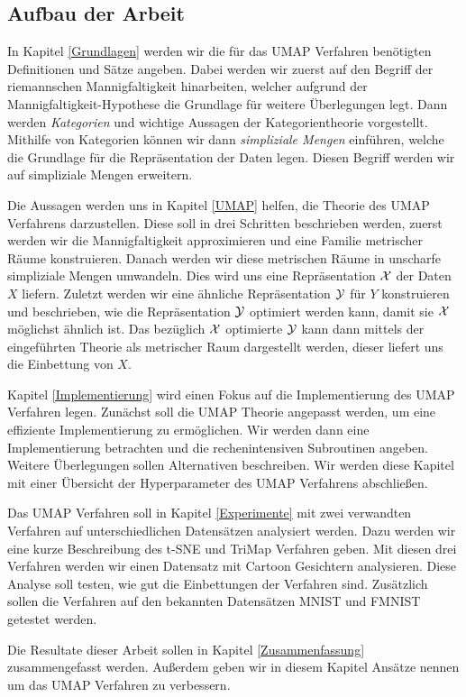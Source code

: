 \subsection*{Aufbau der Arbeit}
	In Kapitel \ref{Grundlagen} werden wir die für das UMAP Verfahren benötigten Definitionen und Sätze angeben. 
	Dabei werden wir zuerst auf den Begriff der riemannschen Mannigfaltigkeit hinarbeiten, welcher aufgrund 
	der Mannigfaltigkeit-Hypothese die  Grundlage für weitere Überlegungen legt. Dann werden \textit{Kategorien} 
	und wichtige Aussagen der Kategorientheorie vorgestellt. Mithilfe von Kategorien können wir dann \textit{simpliziale Mengen} 
	einführen, welche die Grundlage für die Repräsentation der Daten legen. Diesen Begriff werden wir auf 
	 simpliziale Mengen erweitern. 

	Die Aussagen werden uns in Kapitel \ref{UMAP} helfen, die Theorie des UMAP Verfahrens darzustellen. 
	Diese soll in drei Schritten beschrieben werden, zuerst werden wir die Mannigfaltigkeit approximieren und 
	eine Familie metrischer Räume konstruieren. Danach werden wir diese metrischen Räume in unscharfe simpliziale 
	Mengen umwandeln. Dies wird uns eine Repräsentation $\mathcal{X}$ der Daten $X$ liefern. Zuletzt werden wir eine ähnliche 
	Repräsentation $\mathcal{Y}$ für $Y$ konstruieren und beschrieben, wie die Repräsentation $\mathcal{Y}$ optimiert werden kann, 
	damit sie $\mathcal{X}$ möglichst ähnlich ist. Das bezüglich $\mathcal{X}$ optimierte $\mathcal{Y}$ kann dann mittels der eingeführten 
	Theorie als metrischer Raum dargestellt werden, dieser liefert uns die Einbettung von $X$. 

	Kapitel \ref{Implementierung} wird einen Fokus auf die Implementierung des UMAP Verfahren legen. Zunächst soll 
	die UMAP Theorie angepasst werden, um eine effiziente Implementierung zu ermöglichen. Wir werden dann eine 
	Implementierung \cite{cpu} betrachten und die rechenintensiven Subroutinen angeben. Weitere Überlegungen sollen 
	Alternativen beschreiben. Wir werden diese Kapitel mit einer Übersicht der Hyperparameter des UMAP Verfahrens 
	abschließen. 

	Das UMAP Verfahren soll in Kapitel \ref{Experimente} mit zwei verwandten Verfahren auf unterschiedlichen 
	Datensätzen analysiert werden. Dazu werden wir eine kurze Beschreibung des t-SNE und TriMap Verfahren geben. 
	Mit diesen drei Verfahren werden wir einen Datensatz mit Cartoon Gesichtern analysieren. Diese Analyse soll 
	testen, wie gut die Einbettungen der Verfahren sind. Zusätzlich sollen die Verfahren auf den bekannten 
	Datensätzen MNIST und FMNIST getestet werden. 

	Die Resultate dieser Arbeit sollen in Kapitel \ref{Zusammenfassung} zusammengefasst werden. 
	Außerdem geben wir in diesem Kapitel Ansätze nennen um das UMAP Verfahren zu verbessern. 

